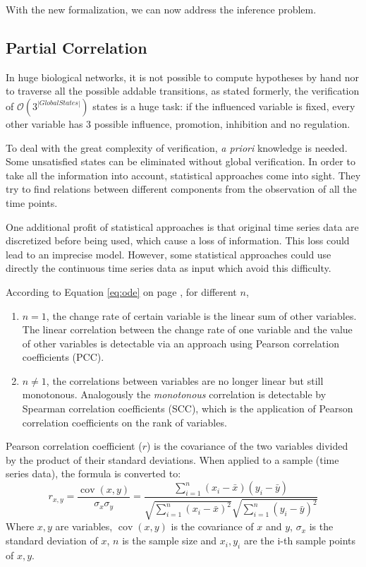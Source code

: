 With the new formalization, we can now address the inference problem.


\subsection{Partial Correlation}

In huge biological networks, it is not possible to compute hypotheses by hand nor to traverse all the possible addable transitions, as stated formerly, the verification of $\mathcal{O}(3^{|Global States|})$ states is a huge task: if the influenced variable is fixed, every other variable has 3 possible influence, promotion, inhibition and no regulation.
 
To deal with the great complexity of verification, \textit{a priori} knowledge is needed. 
Some unsatisfied states can be eliminated without global verification.  
In order to take all the information into account, statistical approaches come into sight.
They try to find relations between different components from the observation of all the time points.

One additional profit of statistical approaches is that original time series data are discretized before being used, which cause a loss of information.
This loss could lead to an imprecise model.
However, some statistical approaches could use directly the continuous time series data as input which avoid this difficulty.

According to Equation \ref{eq:ode} on page \pageref{eq:ode}, for different $n$,
\begin{enumerate}
    \item $n=1$, the change rate of certain variable is the linear sum of other variables.
    The linear correlation between the change rate of one variable and the value of other variables is detectable via an approach using Pearson correlation coefficients (PCC).
    \item $n\neq 1$, the correlations between variables are no longer linear but still monotonous.
    Analogously the \textit{monotonous} correlation is detectable by Spearman correlation coefficients (SCC), which is the application of Pearson correlation coefficients on the rank of variables.
\end{enumerate}

\begin{definition}
    Pearson correlation coefficient ($r$) is the covariance of the two variables divided by the product of their standard deviations.
    When applied to a sample (time series data), the formula is converted to:
    $${\displaystyle r_{x,y}={\frac {\operatorname {cov} (x,y)}{\sigma _{x}\sigma _{y}}}={\frac {\sum _{i=1}^{n}(x_{i}-{\bar {x}})(y_{i}-{\bar {y}})}{{\sqrt {\sum _{i=1}^{n}(x_{i}-{\bar {x}})^{2}}}{\sqrt {\sum _{i=1}^{n}(y_{i}-{\bar {y}})^{2}}}}}}$$
    Where $x,y$ are variables, $\operatorname {cov} (x,y)$ is the covariance of $x$ and $y$, $\sigma _{x}$ is the standard deviation of $x$, $n$ is the sample size and $x_i,y_i$ are the i-th sample points of $x,y$.
\end{definition}

